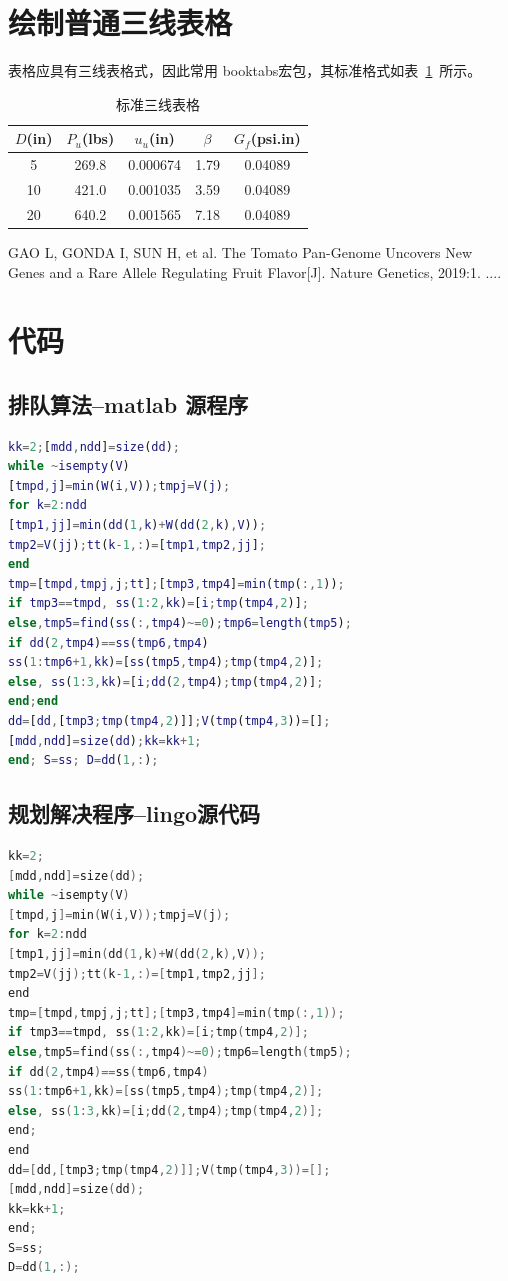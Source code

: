 \documentclass{whutmod}
\begin{document}
\section{绘制普通三线表格}
表格应具有三线表格式，因此常用 booktabs宏包，其标准格式如表~\ref{tab001}~所示。
\begin{table}[!htbp]
	\caption{标准三线表格}\label{tab001} \centering
	\begin{tabular}{ccccc}
		\toprule[1.5pt]
		$D$(in) & $P_u$(lbs) & $u_u$(in) & $\beta$ & $G_f$(psi.in)\\
		\midrule[1pt]
		5 & 269.8 & 0.000674 & 1.79 & 0.04089\\
		10 & 421.0 & 0.001035 & 3.59 & 0.04089\\
		20 & 640.2 & 0.001565 & 7.18 & 0.04089\\
		\bottomrule[1.5pt]
	\end{tabular}
\end{table}

\begin{thebibliography}{9}%
	 GAO L, GONDA I, SUN H, et al. The Tomato Pan-Genome Uncovers New Genes and a	Rare Allele Regulating Fruit Flavor[J]. Nature Genetics, 2019:1.
	 ....
\end{thebibliography}

\appendix %
\section{代码}
\subsection{排队算法--matlab 源程序}
\begin{lstlisting}[language=matlab]
kk=2;[mdd,ndd]=size(dd);
while ~isempty(V)
[tmpd,j]=min(W(i,V));tmpj=V(j);
for k=2:ndd
[tmp1,jj]=min(dd(1,k)+W(dd(2,k),V));
tmp2=V(jj);tt(k-1,:)=[tmp1,tmp2,jj];
end
tmp=[tmpd,tmpj,j;tt];[tmp3,tmp4]=min(tmp(:,1));
if tmp3==tmpd, ss(1:2,kk)=[i;tmp(tmp4,2)];
else,tmp5=find(ss(:,tmp4)~=0);tmp6=length(tmp5);
if dd(2,tmp4)==ss(tmp6,tmp4)
ss(1:tmp6+1,kk)=[ss(tmp5,tmp4);tmp(tmp4,2)];
else, ss(1:3,kk)=[i;dd(2,tmp4);tmp(tmp4,2)];
end;end
dd=[dd,[tmp3;tmp(tmp4,2)]];V(tmp(tmp4,3))=[];
[mdd,ndd]=size(dd);kk=kk+1;
end; S=ss; D=dd(1,:);
\end{lstlisting}
\subsection{规划解决程序--lingo源代码}
\begin{lstlisting}[language=c]
kk=2;
[mdd,ndd]=size(dd);
while ~isempty(V)
[tmpd,j]=min(W(i,V));tmpj=V(j);
for k=2:ndd
[tmp1,jj]=min(dd(1,k)+W(dd(2,k),V));
tmp2=V(jj);tt(k-1,:)=[tmp1,tmp2,jj];
end
tmp=[tmpd,tmpj,j;tt];[tmp3,tmp4]=min(tmp(:,1));
if tmp3==tmpd, ss(1:2,kk)=[i;tmp(tmp4,2)];
else,tmp5=find(ss(:,tmp4)~=0);tmp6=length(tmp5);
if dd(2,tmp4)==ss(tmp6,tmp4)
ss(1:tmp6+1,kk)=[ss(tmp5,tmp4);tmp(tmp4,2)];
else, ss(1:3,kk)=[i;dd(2,tmp4);tmp(tmp4,2)];
end;
end
dd=[dd,[tmp3;tmp(tmp4,2)]];V(tmp(tmp4,3))=[];
[mdd,ndd]=size(dd);
kk=kk+1;
end;
S=ss;
D=dd(1,:);
\end{lstlisting}
\end{document}
